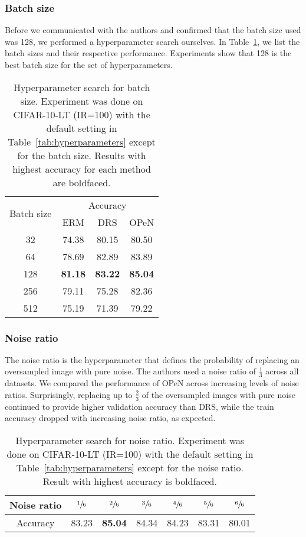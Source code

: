 \subsubsection{Batch size}

Before we communicated with the authors and confirmed that the batch size used was 128, we performed a hyperparameter search ourselves. In Table~\ref{tab:batch_size}, we list the batch sizes and their respective performance. Experiments show that 128 is the best batch size for the set of hyperparameters.

\begin{table}[!ht]
    \centering
    \begin{tabular}{c|ccc}
        \multirow{2}{*}{Batch size} & \multicolumn{3}{c}{Accuracy} \\
         & ERM & DRS & OPeN \\ \hline
        32 & 74.38 & 80.15 & 80.50 \\
        64 & 78.69 & 82.89 & 83.89 \\
        128 & \textbf{81.18} & \textbf{83.22} & \textbf{85.04} \\
        256 & 79.11 & 75.28 & 82.36 \\
        512 & 75.19 & 71.39 & 79.22 \\
    \end{tabular}
    \caption{Hyperparameter search for batch size. Experiment was done on CIFAR-10-LT (IR=100) with the default setting in Table~\ref{tab:hyperparameters} except for the batch size. Results with highest accuracy for each method are boldfaced.}
    \label{tab:batch_size}
\end{table}

\subsubsection{Noise ratio}

The noise ratio is the hyperparameter that defines the probability of replacing an oversampled image with pure noise. The authors used a noise ratio of $\frac{1}{3}$ across all datasets. We compared the performance of OPeN across increasing levels of noise ratios. Surprisingly, replacing up to $\frac{2}{3}$ of the oversampled images with pure noise continued to provide higher validation accuracy than DRS, while the train accuracy dropped with increasing noise ratio, as expected.

\begin{table}[!ht]
    \centering
    \begin{tabular}{c|c|c|c|c|c|c}
        Noise ratio & $\sfrac{1}{6}$ & \textbf{$\sfrac{2}{6}$} & $\sfrac{3}{6}$ & $\sfrac{4}{6}$ & $\sfrac{5}{6}$ & $\sfrac{6}{6}$ \\
        \hline
        Accuracy & 83.23 & \textbf{85.04} & 84.34 & 84.23 & 83.31 & 80.01
    \end{tabular}
    \caption{Hyperparameter search for noise ratio. Experiment was done on CIFAR-10-LT (IR=100) with the default setting in Table~\ref{tab:hyperparameters} except for the noise ratio. Result with highest accuracy is boldfaced.}
    \label{tab:noise_ratio}
\end{table}


